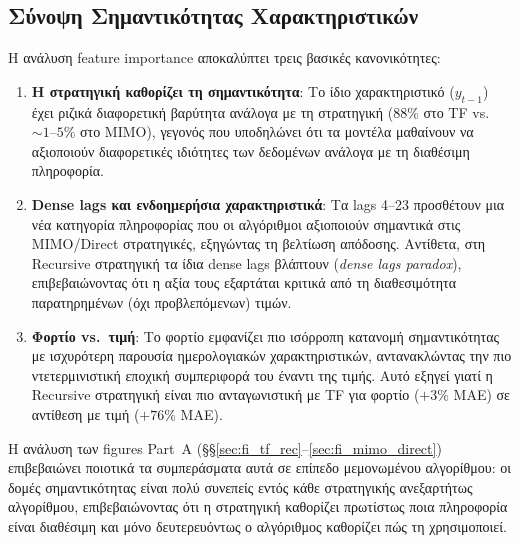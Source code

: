 

\subsection{Σύνοψη Σημαντικότητας Χαρακτηριστικών}
\label{sec:fi_conclusions}

Η ανάλυση feature importance αποκαλύπτει τρεις βασικές κανονικότητες:

\begin{enumerate}
    \item \textbf{Η στρατηγική καθορίζει τη σημαντικότητα}: Το ίδιο χαρακτηριστικό
    ($y_{t-1}$) έχει ριζικά διαφορετική βαρύτητα ανάλογα με τη στρατηγική
    ($88\%$ στο TF vs.\ ${\sim}1$--$5\%$ στο MIMO), γεγονός που υποδηλώνει ότι τα μοντέλα
    μαθαίνουν να αξιοποιούν διαφορετικές ιδιότητες των δεδομένων ανάλογα με τη
    διαθέσιμη πληροφορία.

    \item \textbf{Dense lags και ενδοημερήσια χαρακτηριστικά}:
    Τα lags 4--23 προσθέτουν μια νέα κατηγορία πληροφορίας που οι αλγόριθμοι
    αξιοποιούν σημαντικά στις MIMO/Direct στρατηγικές, εξηγώντας τη βελτίωση
    απόδοσης. Αντίθετα, στη Recursive στρατηγική τα ίδια dense lags
    βλάπτουν (\textit{dense lags paradox}), επιβεβαιώνοντας ότι η αξία τους
    εξαρτάται κριτικά από τη διαθεσιμότητα παρατηρημένων (όχι προβλεπόμενων)
    τιμών.

    \item \textbf{Φορτίο vs.\ τιμή}: Το φορτίο εμφανίζει πιο ισόρροπη κατανομή
    σημαντικότητας με ισχυρότερη παρουσία ημερολογιακών χαρακτηριστικών,
    αντανακλώντας την πιο ντετερμινιστική εποχική συμπεριφορά του έναντι της τιμής.
    Αυτό εξηγεί γιατί η Recursive στρατηγική είναι πιο ανταγωνιστική με TF για
    φορτίο ($+3\%$ MAE) σε αντίθεση με τιμή ($+76\%$ MAE).
\end{enumerate}

Η ανάλυση των figures Part~A (§§\ref{sec:fi_tf_rec}--\ref{sec:fi_mimo_direct})
επιβεβαιώνει ποιοτικά τα συμπεράσματα αυτά σε επίπεδο μεμονωμένου αλγορίθμου:
οι δομές σημαντικότητας είναι πολύ συνεπείς εντός κάθε στρατηγικής
ανεξαρτήτως αλγορίθμου, επιβεβαιώνοντας ότι η στρατηγική καθορίζει πρωτίστως
ποια πληροφορία είναι διαθέσιμη και μόνο δευτερευόντως ο αλγόριθμος καθορίζει
πώς τη χρησιμοποιεί.
